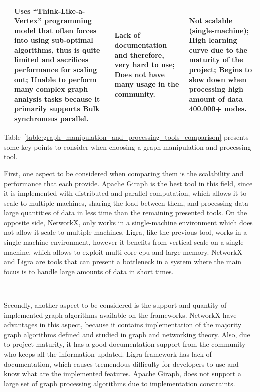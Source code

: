 \begin{table}[H]
\begin{tabularx}{\linewidth} {
            >{\hsize=0.3\hsize}X|
            >{\hsize=1.0\hsize}X|
            >{\hsize=1.0\hsize}X|
            >{\hsize=1.0\hsize}X|}
        \multicolumn{1}{|l|}{\textbf{Cons}}
         & Uses ``Think-Like-a-Vertex'' programming model that often forces into using sub-optimal algorithms, thus is quite limited and sacrifices performance for scaling out; \newline
        Unable to perform many complex graph analysis tasks because it primarily supports Bulk synchronous parallel.
         & Lack of documentation and therefore, very hard to use; \newline
        Does not have many usage in the community.
         & Not scalable (single-machine); \newline
        High learning curve due to the maturity of the project; \newline
        Begins to slow down when processing high amount of data -- 400.000+ nodes.                                                                                                        \\ \hline
    \end{tabularx}
\end{table}

Table~\ref{table:graph_manipulation_and_processing_tools_comparison} presents some key points to consider when choosing a graph manipulation and processing tool.

First, one aspect to be considered when comparing them is the scalability and performance that each provide. Apache Giraph is the best tool in this field, since it is implemented with distributed and parallel computation, which allows it to scale to multiple-machines, sharing the load between them, and processing data large quantities of data in less time than the remaining presented tools. On the opposite side, NetworkX, only works in a single-machine environment which does not allow it scale to multiple-machines. Ligra, like the previous tool, works in a single-machine environment, however it benefits from vertical scale on a single-machine, which allows to exploit multi-core \gls{cpu} and large memory. NetworkX and Ligra are tools that can present a bottleneck in a system where the main focus is to handle large amounts of data in short times.

\,

Secondly, another aspect to be considered is the support and quantity of implemented graph algorithms available on the frameworks. NetworkX have advantages in this aspect, because it contains implementation of the majority graph algorithms defined and studied in graph and networking theory. Also, due to project maturity, it has a good documentation support from the community who keeps all the information updated. Ligra framework has lack of documentation, which causes tremendous difficulty for developers to use and know what are the implemented features. Apache Giraph, does not support a large set of graph processing algorithms due to implementation constraints.

